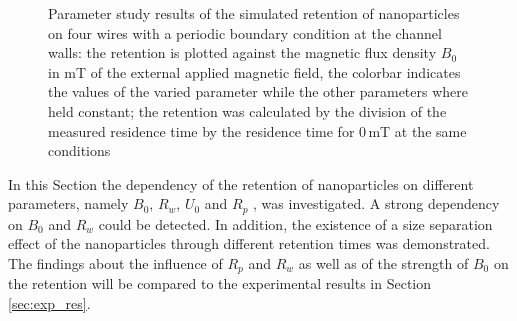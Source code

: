 \begin{figure}[H]
         \caption[Parameter study results of the simulated retention of nanoparticles on four wires with a periodic boundary condition at the channel walls]{Parameter study results of the simulated retention of nanoparticles on four wires with a periodic boundary condition at the channel walls: the retention is plotted against the magnetic flux density $B_{0}$ in mT of the external applied magnetic field, the colorbar indicates the values of the varied parameter while the other parameters where held constant; the retention was calculated by the division of the measured residence time by the residence time for 0\,mT at the same conditions
         }
        \label{fig:fw_param_res_periodicBC}
  \end{figure} 
    

In this Section the dependency of the retention of nanoparticles on different parameters, namely $B_{0}$, $R_{w}$, $U_{0}$ and $R_{p}$ , was investigated. A strong dependency on $B_{0}$ and $R_{w}$ could be detected. In addition, the existence of a size separation effect of the nanoparticles through different retention times was demonstrated. The findings about the influence of $R_{p}$ and $R_{w}$ as well as of the strength of $B_{0}$ on the retention will be compared to the experimental results in Section\,\ref{sec:exp_res}.


